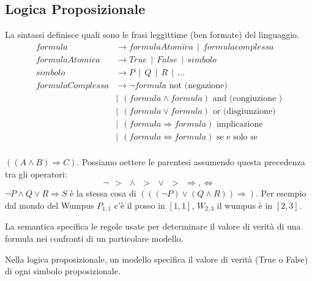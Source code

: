 \subsection{Logica Proposizionale}
\begin{definition}[Sintassi]
    La sintassi definisce quali sono le frasi leggittime (ben formate) del linguaggio.
    \begin{equation*}
        \begin{split}
            formula & \longrightarrow formulaAtomica \:\: | \:\: formula complessa \\
            formulaAtomica & \longrightarrow True \:\: | \:\: False \:\: | \:\: simbolo \\
            simbolo & \longrightarrow P \:\: | \:\: Q \:\: | \:\: R \:\:| \:\: \dots\\
            formulaComplessa & \longrightarrow \lnot formula \text{ not (negazione)}\\
            & | \:\: (formula \land formula) \text{ and (congiuzione )}\\
            & | \:\: (formula \lor formula) \text{ or (disgiunzione)}\\
            & | \:\: (formula \Rightarrow formula) \text{ implicazione}\\
            & | \:\: (formula \Leftrightarrow formula) \text{ se e solo se}\\
        \end{split}
    \end{equation*}
\end{definition}

\begin{example}
    $((A \land B) \Rightarrow C)$.
    Possiamo oettere le parentesi assumendo questa precedenza tra gli operatori:
    $$\lnot \:\: > \:\: \land \:\: > \:\: \lor \:\: > \:\: \Rightarrow, \Leftrightarrow$$
    $\lnot P \land Q \lor R \Rightarrow S$ è la stessa cosa di $(((\lnot P) \lor (Q \land R)) \Rightarrow)$. Per esempio
    dal mondo del Wumpus $P_{1,1}$ c'è il posso in $[1,1]$, $W_{2,3}$ il wumpus è in $[2,3]$.
\end{example}

\begin{definition}[Semantica]
    La semantica specifica le regole usate per determinare il valore di verità di una formula nei confronti di un particolare modello.
\end{definition}
\hspace{-15pt}Nella logica proposizionale, un modello specifica il valore di verità (True o False) di ogni simbolo proposizionale.